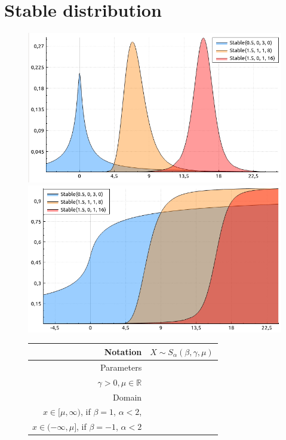\documentclass[a4paper,11pt]{article}
\theoremstyle{plain}
\theoremstyle{definition}
\newcommand{\MR}{\mathbb{R}}
\begin{document}
	\section{Stable distribution}
	\begin{figure}[!htb]\centering
		\begin{minipage}{0.55\textwidth}
			\includegraphics[width=\linewidth, right]{stable_pdf}
			\captionsetup{labelformat=empty}
			\includegraphics[width=\linewidth, right]{stable_cdf}
			\captionsetup{labelformat=empty}
		\end{minipage}
		\begin{minipage}{0.4\textwidth}
		\begin{tabular}{| r | l |}
			\hline
			Notation & $X \sim S_\alpha(\beta, \gamma, \mu)$ \\
			\hline
			Parameters & \pbox{\linewidth}{$\alpha \in (0, 2], \beta \in [-1, 1],$\\ $\gamma > 0, \mu \in \MR $} \\
			\hline
			Domain & \pbox{\linewidth}{$ x \in \MR$, if  $\beta \neq 1$, \\  $ x \in [\mu, \infty)  $, if  $\beta = 1$, $\alpha < 2$, \\ $ x \in (-\infty, \mu]  $, if  $\beta = -1$, $\alpha < 2$}  \\

\end{tabular}
\end{minipage}
\end{figure}
\end{document}
